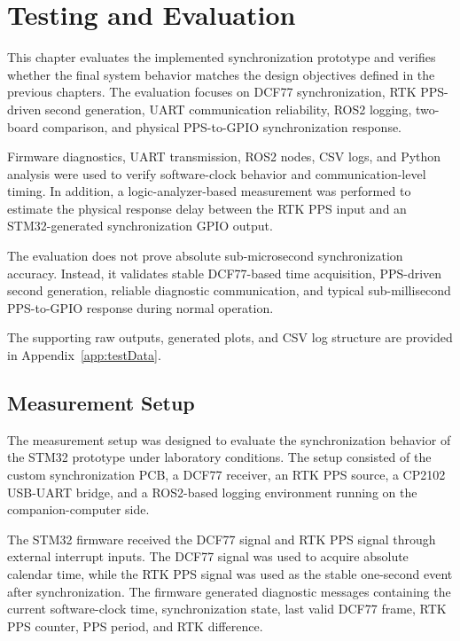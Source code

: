 
\chapter{Testing and Evaluation\label{chap:testing}}

This chapter evaluates the implemented synchronization prototype and verifies whether the final system behavior matches the design objectives defined in the previous chapters. The evaluation focuses on DCF77 synchronization, RTK PPS-driven second generation, UART communication reliability, ROS2 logging, two-board comparison, and physical PPS-to-GPIO synchronization response.

Firmware diagnostics, UART transmission, ROS2 nodes, CSV logs, and Python analysis were used to verify software-clock behavior and communication-level timing. In addition, a logic-analyzer-based measurement was performed to estimate the physical response delay between the RTK PPS input and an STM32-generated synchronization GPIO output.

The evaluation does not prove absolute sub-microsecond synchronization accuracy. Instead, it validates stable DCF77-based time acquisition, PPS-driven second generation, reliable diagnostic communication, and typical sub-millisecond PPS-to-GPIO response during normal operation.

The supporting raw outputs, generated plots, and CSV log structure are provided in Appendix~\ref{app:testData}.

\section{Measurement Setup}

The measurement setup was designed to evaluate the synchronization behavior of the STM32 prototype under laboratory conditions. The setup consisted of the custom synchronization PCB, a DCF77 receiver, an RTK PPS source, a CP2102 USB-UART bridge, and a ROS2-based logging environment running on the companion-computer side.

The STM32 firmware received the DCF77 signal and RTK PPS signal through external interrupt inputs. The DCF77 signal was used to acquire absolute calendar time, while the RTK PPS signal was used as the stable one-second event after synchronization. The firmware generated diagnostic messages containing the current software-clock time, synchronization state, last valid DCF77 frame, RTK PPS counter, PPS period, and RTK difference.

